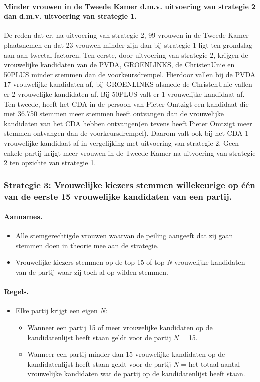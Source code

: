 \paragraph{Minder vrouwen in de Tweede Kamer d.m.v. uitvoering van strategie 2 dan d.m.v. uitvoering van strategie 1.}
De reden dat er, na uitvoering van strategie 2, 99 vrouwen in de Tweede Kamer plaatsnemen en dat 23 vrouwen minder zijn dan bij strategie 1 ligt ten grondslag aan aan tweetal factoren. Ten eerste, door uitvoering van strategie 2, krijgen de vrouwelijke kandidaten van de PVDA, GROENLINKS, de ChristenUnie en 50PLUS minder stemmen dan de voorkeursdrempel. Hierdoor vallen bij de PVDA 17 vrouwelijke kandidaten af, bij GROENLINKS alsmede de ChristenUnie vallen er 2 vrouwelijke kandidaten af. Bij 50PLUS valt er 1 vrouwelijke kandidaat af. Ten tweede, heeft het CDA in de persoon van Pieter Omtzigt een kandidaat die met 36.750 stemmen meer stemmen heeft ontvangen dan de vrouwelijke kandidaten van het CDA hebben ontvangen(en tevens heeft Pieter Omtzigt meer stemmen ontvangen dan de voorkeursdrempel). Daarom valt ook bij het CDA 1 vrouwelijke kandidaat af in vergelijking met uitvoering van strategie 2. Geen enkele partij krijgt meer vrouwen in de Tweede Kamer na uitvoering van strategie 2 ten opzichte van strategie 1.   

\subsubsection*{Strategie 3: Vrouwelijke kiezers stemmen willekeurige op één van de eerste 15 vrouwelijke kandidaten van een partij.}

\paragraph{Aannames.}
\begin{itemize}
	\item
Alle stemgerechtigde vrouwen waarvan de peiling aangeeft dat zij gaan stemmen doen in theorie mee aan de strategie.
	\item
Vrouwelijke kiezers stemmen op de top 15 of top \textit{N} vrouwelijke kandidaten van de partij waar zij toch al op wilden stemmen.
\end{itemize}

\paragraph{Regels.}
\begin{itemize}
\item
Elke partij krijgt een eigen \textit{N}:
	\begin{itemize}
		\item
Wanneer een partij 15 of meer vrouwelijke kandidaten op de kandidatenlijst heeft staan geldt voor de partij 	\textit{N} = 15.
		\item
Wanneer een partij minder dan 15 vrouwelijke kandidaten op de kandidatenlijst heeft staan geldt voor de partij \textit{N} = het totaal aantal vrouwelijke kandidaten wat de partij op de kandidatenlijst heeft staan. 	
	\end{itemize}
\end{itemize}

